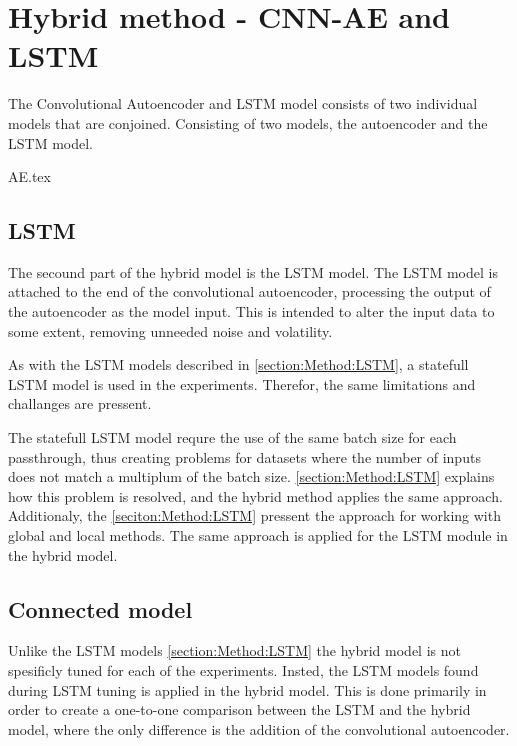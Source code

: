 
\section{Hybrid method - CNN-AE and LSTM}
\label{section:Method:CNN-AE-LSTM}


The Convolutional Autoencoder and LSTM model consists of two individual models that are conjoined.
Consisting of two models,
the autoencoder and the LSTM model.


{AE.tex}


\subsection{LSTM}

The secound part of the hybrid model is the LSTM model.
The LSTM model is attached to the end of the convolutional autoencoder,
processing the output of the autoencoder as the model input.
This is intended to alter the input data to some extent, removing unneeded noise and volatility.

As with the LSTM models described in \cref{section:Method:LSTM}, a statefull LSTM model is used in the experiments.
Therefor, the same limitations and challanges are pressent.

The statefull LSTM model requre the use of the same batch size for each passthrough, thus creating problems for datasets where the number
of inputs does not match a multiplum of the batch size.
\cref{section:Method:LSTM} explains how this problem is resolved, and the hybrid method applies the same approach.
Additionaly,
the \cref{seciton:Method:LSTM} pressent the approach for working with global and local methods.
The same approach is applied for the LSTM module in the hybrid model.


\subsection{Connected model}

Unlike the LSTM models \cref{section:Method:LSTM} the hybrid model is not spesificly tuned for each of the experiments.
Insted, the LSTM models found during LSTM tuning is applied in the hybrid model.
This is done primarily in order to create a one-to-one comparison between the LSTM and the hybrid model,
where the only difference is the addition of the convolutional autoencoder.



